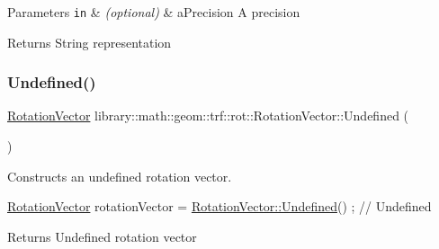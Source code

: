 \begin{DoxyParams}[1]{Parameters}
\mbox{\tt in}  & {\em (optional)} & a\+Precision A precision \\
\hline
\end{DoxyParams}
\begin{DoxyReturn}{Returns}
String representation 
\end{DoxyReturn}
\mbox{\label{classlibrary_1_1math_1_1geom_1_1trf_1_1rot_1_1_rotation_vector_a2641dcca56e633f5639bbcb9dcb02fa2}} 
\subsubsection{\texorpdfstring{Undefined()}{Undefined()}}
{\footnotesize\ttfamily \hyperlink{classlibrary_1_1math_1_1geom_1_1trf_1_1rot_1_1_rotation_vector}{Rotation\+Vector} library\+::math\+::geom\+::trf\+::rot\+::\+Rotation\+Vector\+::\+Undefined (\begin{DoxyParamCaption}{ }\end{DoxyParamCaption})\hspace{0.3cm}{\ttfamily [static]}}



Constructs an undefined rotation vector. 


\begin{DoxyCode}
\hyperlink{classlibrary_1_1math_1_1geom_1_1trf_1_1rot_1_1_rotation_vector_a32b1fab5e81bc24d777324daf5849205}{RotationVector} rotationVector = \hyperlink{classlibrary_1_1math_1_1geom_1_1trf_1_1rot_1_1_rotation_vector_a2641dcca56e633f5639bbcb9dcb02fa2}{RotationVector::Undefined}() ; \textcolor{comment}{//
       Undefined}
\end{DoxyCode}


\begin{DoxyReturn}{Returns}
Undefined rotation vector 
\end{DoxyReturn}
\mbox{\label{classlibrary_1_1math_1_1geom_1_1trf_1_1rot_1_1_rotation_vector_a6dd13d867fa6080a5d45be164ce30c9b}} 
